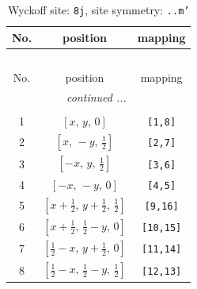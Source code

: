 \documentclass[fleqn,8pt]{jsarticle}
\begin{document}
\begin{longtable}{ccc}
\caption{Wyckoff site: {\tt 8j}, site symmetry: {\tt ..m'}}
 \\
 \hline \hline
No. & position & mapping \\ \hline \endfirsthead

\multicolumn{2}{l}{\tablename\ \thetable{}} \\
 \hline \hline
No. & position & mapping \\ \hline \endhead

 \hline \hline
\multicolumn{2}{r}{\footnotesize\it continued ...} \\ \endfoot

 \hline \hline
\multicolumn{2}{r}{} \\ \endlastfoot

1 & $\left[ x,\, y,\, 0 \right]$ & {\tt [1,8]} \\ \hline
2 & $\left[ x,\, - y,\, \frac{1}{2} \right]$ & {\tt [2,7]} \\ \hline
3 & $\left[ - x,\, y,\, \frac{1}{2} \right]$ & {\tt [3,6]} \\ \hline
4 & $\left[ - x,\, - y,\, 0 \right]$ & {\tt [4,5]} \\ \hline
5 & $\left[ x + \frac{1}{2},\, y + \frac{1}{2},\, \frac{1}{2} \right]$ & {\tt [9,16]} \\ \hline
6 & $\left[ x + \frac{1}{2},\, \frac{1}{2} - y,\, 0 \right]$ & {\tt [10,15]} \\ \hline
7 & $\left[ \frac{1}{2} - x,\, y + \frac{1}{2},\, 0 \right]$ & {\tt [11,14]} \\ \hline
8 & $\left[ \frac{1}{2} - x,\, \frac{1}{2} - y,\, \frac{1}{2} \right]$ & {\tt [12,13]} \\
\end{longtable}
\renewcommand{\arraystretch}{1.2}
\end{document}
